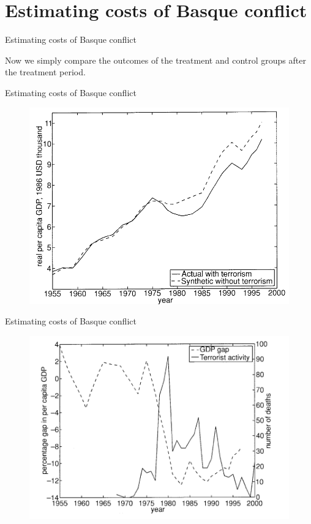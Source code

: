 \documentclass[notes,11pt, aspectratio=169]{beamer}
\newenvironment{wideitemize}{\itemize\addtolength{\itemsep}{10pt}}{\enditemize}
\begin{document}
\section{Estimating costs of Basque conflict}    

\begin{frame}{Estimating costs of Basque conflict}
    \begin{wideitemize}
        \item Now we simply compare the outcomes of the treatment and control groups after the treatment period. 
    \end{wideitemize}
\end{frame}

\begin{frame}{Estimating costs of Basque conflict}
    \begin{figure}
        \centering
        \includegraphics[width = .7\textwidth]{figures/ts.png}
        \label{fig:ts_1}
    \end{figure}
\end{frame}

\begin{frame}{Estimating costs of Basque conflict}
    \begin{figure}
        \centering
        \includegraphics[width = .7\textwidth]{figures/ts1.png}
        \label{fig:ts_11}
    \end{figure}
\end{frame}
\end{document}
